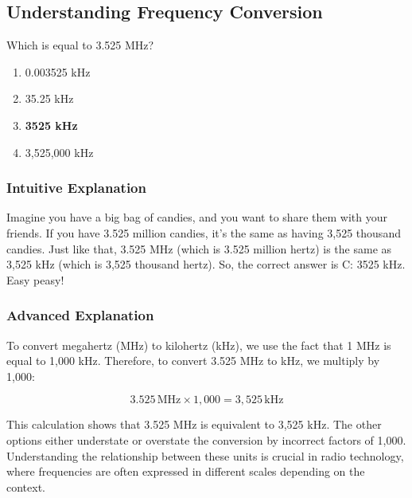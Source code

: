 \subsection{Understanding Frequency Conversion}\label{T5B07}

\begin{tcolorbox}[colback=gray!10!white,colframe=black!75!black,title=T5B07]
Which is equal to 3.525 MHz?
\begin{enumerate}[label=\Alph*)]
    \item 0.003525 kHz
    \item 35.25 kHz
    \item \textbf{3525 kHz}
    \item 3,525,000 kHz
\end{enumerate}
\end{tcolorbox}

\subsubsection{Intuitive Explanation}
Imagine you have a big bag of candies, and you want to share them with your friends. If you have 3.525 million candies, it's the same as having 3,525 thousand candies. Just like that, 3.525 MHz (which is 3.525 million hertz) is the same as 3,525 kHz (which is 3,525 thousand hertz). So, the correct answer is C: 3525 kHz. Easy peasy!

\subsubsection{Advanced Explanation}
To convert megahertz (MHz) to kilohertz (kHz), we use the fact that 1 MHz is equal to 1,000 kHz. Therefore, to convert 3.525 MHz to kHz, we multiply by 1,000:

\[
3.525 \, \text{MHz} \times 1,000 = 3,525 \, \text{kHz}
\]

This calculation shows that 3.525 MHz is equivalent to 3,525 kHz. The other options either understate or overstate the conversion by incorrect factors of 1,000. Understanding the relationship between these units is crucial in radio technology, where frequencies are often expressed in different scales depending on the context.

